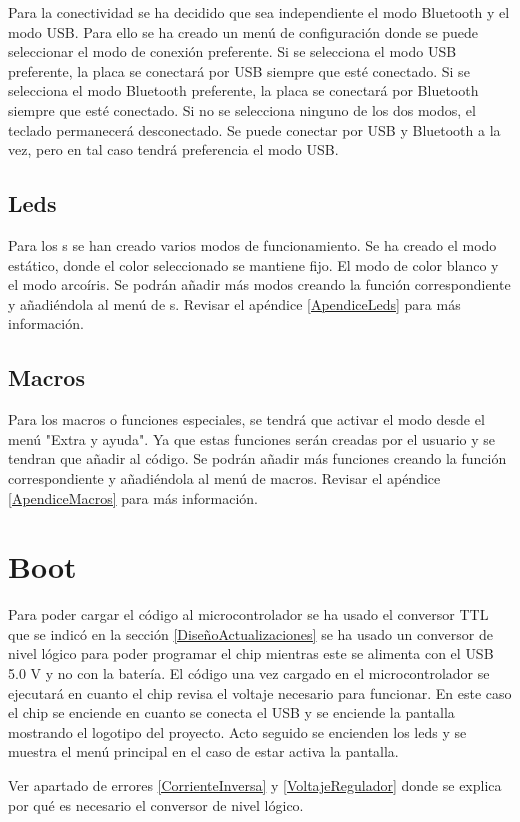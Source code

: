 Para la conectividad se ha decidido que sea independiente el modo \gls{Bluetooth} y el modo \gls{USB}. Para ello se ha creado un menú de configuración donde se puede seleccionar el modo de conexión preferente. Si se selecciona el modo \gls{USB} preferente, la placa se conectará por \gls{USB} siempre que esté conectado. Si se selecciona el modo \gls{Bluetooth} preferente, la placa se conectará por \gls{Bluetooth} siempre que esté conectado. Si no se selecciona ninguno de los dos modos, el teclado permanecerá desconectado. Se puede conectar por \gls{USB} y \gls{Bluetooth} a la vez, pero en tal caso tendrá preferencia el modo \gls{USB}.

\subsection{Leds}

Para los s se han creado varios modos de funcionamiento. Se ha creado el modo estático, donde el color seleccionado se mantiene fijo. El modo de color blanco y el modo arcoíris. Se podrán añadir más modos creando la función correspondiente y añadiéndola al menú de s. Revisar el apéndice \ref{ApendiceLeds} para más información.

\subsection{Macros}

Para los macros o funciones especiales, se tendrá que activar el modo desde el menú "Extra y ayuda". Ya que estas funciones serán creadas por el usuario y se tendran que añadir al código. Se podrán añadir más funciones creando la función correspondiente y añadiéndola al menú de macros. Revisar el apéndice \ref{ApendiceMacros} para más información.

\section{Boot}

Para poder cargar el código al microcontrolador se ha usado el conversor \gls{TTL} que se indicó en la sección \ref{DiseñoActualizaciones} se ha usado un conversor de nivel lógico para poder programar el chip mientras este se alimenta con el \gls{USB} 5.0 V y no con la batería.
El código una vez cargado en el microcontrolador se ejecutará en cuanto el chip revisa el voltaje necesario para funcionar. En este caso el chip se enciende en cuanto se conecta el \gls{USB} y se enciende la pantalla mostrando el logotipo del proyecto. Acto seguido se encienden los leds y se muestra el menú principal en el caso de estar activa la pantalla.

\begin{tcolorbox}[colback=red!11!white, colframe=red!50!white, title=Errores]
    Ver apartado de errores \ref{CorrienteInversa} y \ref{VoltajeRegulador} donde se explica por qué es necesario el conversor de nivel lógico.
\end{tcolorbox}
